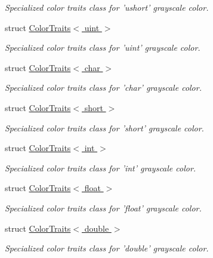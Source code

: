 \begin{DoxyCompactItemize}
\begin{DoxyCompactList}\small\item\em Specialized color traits class for 'ushort' grayscale color. \end{DoxyCompactList}\item 
struct \hyperlink{struct_d_o_1_1_color_traits_3_01uint_01_4}{Color\-Traits$<$ uint $>$}
\begin{DoxyCompactList}\small\item\em Specialized color traits class for 'uint' grayscale color. \end{DoxyCompactList}\item 
struct \hyperlink{struct_d_o_1_1_color_traits_3_01char_01_4}{Color\-Traits$<$ char $>$}
\begin{DoxyCompactList}\small\item\em Specialized color traits class for 'char' grayscale color. \end{DoxyCompactList}\item 
struct \hyperlink{struct_d_o_1_1_color_traits_3_01short_01_4}{Color\-Traits$<$ short $>$}
\begin{DoxyCompactList}\small\item\em Specialized color traits class for 'short' grayscale color. \end{DoxyCompactList}\item 
struct \hyperlink{struct_d_o_1_1_color_traits_3_01int_01_4}{Color\-Traits$<$ int $>$}
\begin{DoxyCompactList}\small\item\em Specialized color traits class for 'int' grayscale color. \end{DoxyCompactList}\item 
struct \hyperlink{struct_d_o_1_1_color_traits_3_01float_01_4}{Color\-Traits$<$ float $>$}
\begin{DoxyCompactList}\small\item\em Specialized color traits class for 'float' grayscale color. \end{DoxyCompactList}\item 
struct \hyperlink{struct_d_o_1_1_color_traits_3_01double_01_4}{Color\-Traits$<$ double $>$}
\begin{DoxyCompactList}\small\item\em Specialized color traits class for 'double' grayscale color. \end{DoxyCompactList}\end{DoxyCompactItemize}

